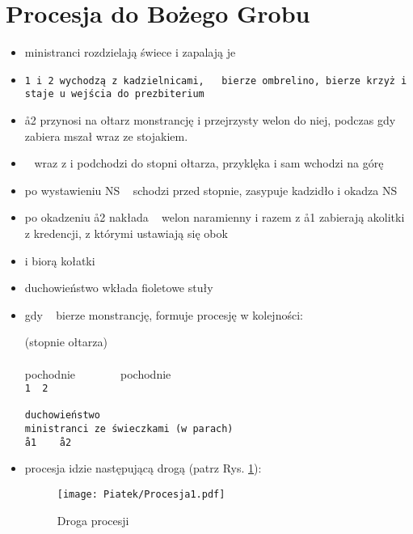 \section{Procesja do Bożego Grobu}

\begin{itemize}
	\item ministranci rozdzielają świece i zapalają je
	\item \tt1 i \tt2 wychodzą z kadzielnicami, \oo~ bierze ombrelino, 
	      bierze krzyż i staje u wejścia do prezbiterium
	\item \aa2 przynosi na ołtarz monstrancję i przejrzysty welon do niej,
	      podczas gdy  zabiera mszał wraz ze stojakiem.
	\item \ii~ wraz z  i  podchodzi do stopni ołtarza, przyklęka i sam
	      wchodzi na górę
	\item po wystawieniu NS \ii~ schodzi przed stopnie, zasypuje kadzidło
	      i okadza NS
	\item po okadzeniu \aa2 nakłada \ii~ welon naramienny i razem z \aa1
	      zabierają akolitki z kredencji, z którymi ustawiają się obok 
	\item {} i  biorą kołatki
	\item duchowieństwo wkłada {\color{violet} fioletowe} stuły
	\item gdy \ii~ bierze monstrancję,  formuje procesję w kolejności:

	      \begin{center}
		      (stopnie ołtarza) \smallskip\\
		      \oo \smallskip\\
		      pochodnie~~~~\ii~~~~pochodnie \smallskip\\
		      \tt1~~\tt2 \smallskip\\
		      ~~ \smallskip\\
		      duchowieństwo \smallskip\\
		      ministranci ze świeczkami (w parach) \smallskip\\
		      \aa1~~~~\aa2 \smallskip\\
		      \downarrow
	      \end{center}

	\item procesja idzie następującą drogą (patrz Rys. \ref{fig:procesja1_pt}):

	      \begin{figure}[h]
		      \centering
		      \texttt{[image: Piatek/Procesja1.pdf]}
		      \caption{Droga procesji}
		      \label{fig:procesja1_pt}
	      \end{figure}


\end{itemize}
